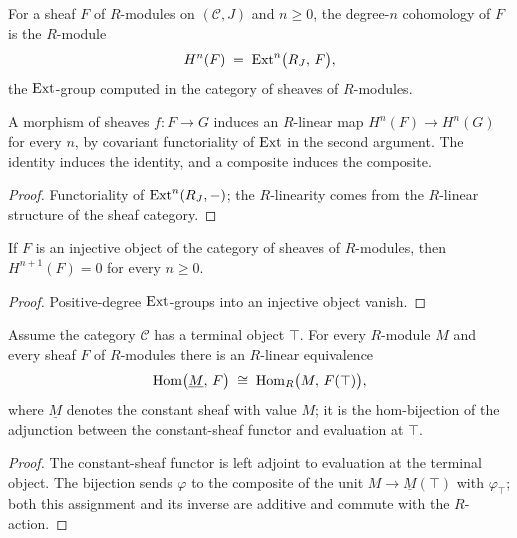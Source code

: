 \begin{definition}
  \label{pa-def:HModule}
  \leanok

  For a sheaf \(F\) of \(R\)-modules on \((\mathcal C, J)\) and \(n \ge 0\), the degree-\(n\)
  cohomology of \(F\) is the \(R\)-module
  \[
    H^n(F) \;=\; \operatorname{Ext}^n\bigl(R_J,\, F\bigr),
  \]
  the \(\operatorname{Ext}\)-group computed in the category of sheaves of \(R\)-modules.
\end{definition}

\begin{definition}[Functoriality]
  \label{pa-def:HModule_map}
  \leanok

  A morphism of sheaves \(f : F \to G\) induces an \(R\)-linear map
  \(H^n(F) \to H^n(G)\) for every \(n\), by covariant functoriality of \(\operatorname{Ext}\) in the second
  argument. The identity induces the identity, and a composite induces the composite.
\end{definition}
\begin{proof}
  \leanok
  Functoriality of \(\operatorname{Ext}^n(R_J, -)\); the \(R\)-linearity comes from the \(R\)-linear
  structure of the sheaf category.
\end{proof}

\begin{lemma}
  \label{pa-lem:HModule_injective_vanishing}
  \leanok

  If \(F\) is an injective object of the category of sheaves of \(R\)-modules, then
  \(H^{n+1}(F) = 0\) for every \(n \ge 0\).
\end{lemma}
\begin{proof}
  \leanok
  Positive-degree \(\operatorname{Ext}\)-groups into an injective object vanish.
\end{proof}

\begin{definition}
  \label{pa-def:constAdjHomEquiv}
  \leanok

  Assume the category \(\mathcal C\) has a terminal object \(\top\). For every \(R\)-module
  \(M\) and every sheaf \(F\) of \(R\)-modules there is an \(R\)-linear equivalence
  \[
    \operatorname{Hom}\bigl(\underline{M},\, F\bigr) \;\cong\; \operatorname{Hom}_R\bigl(M,\, F(\top)\bigr),
  \]
  where \(\underline{M}\) denotes the constant sheaf with value \(M\); it is the hom-bijection
  of the adjunction between the constant-sheaf functor and evaluation at \(\top\).
\end{definition}
\begin{proof}
  \leanok
  The constant-sheaf functor is left adjoint to evaluation at the terminal object. The
  bijection sends \(\varphi\) to the composite of the unit \(M \to \underline{M}(\top)\) with
  \(\varphi_\top\); both this assignment and its inverse are additive and commute with the
  \(R\)-action.
\end{proof}


